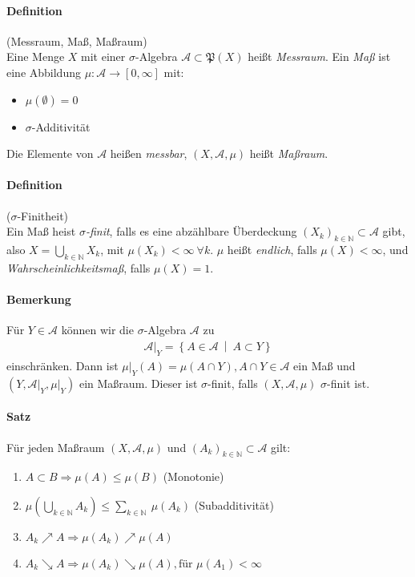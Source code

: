 \documentclass[12pt,a4paper,fleqn]{article}
\def\set#1{{\left\{ #1 \right\}}}
\def\Mid{\ \middle|\ }
\begin{document}
\paragraph{Definition}(Messraum, Maß, Maßraum)\\
Eine Menge $X$ mit einer $\sigma$-Algebra $\mathcal{A} \subset \mathfrak{P}(X)$ heißt \textit{Messraum}. Ein \textit{Maß} ist eine Abbildung $\mu\colon \mathcal{A} \rightarrow [0, \infty]$ mit:
\begin{itemize}
\item $\mu (\emptyset) = 0$
\item $\sigma$-Additivität
\end{itemize}
Die Elemente von $\mathcal{A}$ heißen \textit{messbar}, $(X, \mathcal{A}, \mu)$ heißt \textit{Maßraum}.

\paragraph{Definition}($\sigma$-Finitheit)\\
Ein Maß heist $\sigma$\textit{-finit}, falls es eine abzählbare Überdeckung $(X_k)_{k \in \mathbb{N}} \subset \mathcal{A}$ gibt, also $X = \bigcup_{k \in \mathbb{N}} X_k$, mit $\mu (X_k) < \infty\ \forall k$. $\mu$ heißt \textit{endlich}, falls $\mu (X) < \infty$, und \textit{Wahrscheinlichkeitsmaß}, falls $\mu (X) =1$.

\paragraph{Bemerkung} Für $Y \in \mathcal{A}$ können wir die $\sigma$-Algebra $\mathcal{A}$ zu 
\begin{align*}
\mathcal{A}\vert_Y = \set{A \in \mathcal{A} \Mid A \subset Y}
\end{align*}
einschränken. Dann ist $\mu{\vert _Y} (A) = \mu (A\cap Y), A\cap Y \in \mathcal{A}$ ein Maß und $(Y, \mathcal{A}{\vert _Y}, \mu{\vert_Y})$ ein Maßraum.
Dieser ist $\sigma$-finit, falls $(X, \mathcal{A}, \mu)$ $\sigma$-finit ist.

\paragraph{Satz} Für jeden Maßraum $(X, \mathcal{A}, \mu)$ und $(A_k)_{k \in \mathbb{N}} \subset\mathcal{A}$ gilt:
\begin{enumerate}
\item$A \subset B \Rightarrow \mu (A) \leq \mu(B)$ (Monotonie)
\item$\mu(\bigcup_{k \in \mathbb{N}}A_k) \leq \sum_{k \in \mathbb{N}}\  \mu (A_k)$ (Subadditivität)
\item$A_k \nearrow A \Rightarrow \mu(A_k) \nearrow \mu(A)$
\item$A_k \searrow A \Rightarrow \mu(A_k) \searrow \mu(A), \text{für } \mu(A_1) <\infty$
\end{enumerate}
\end{document}
